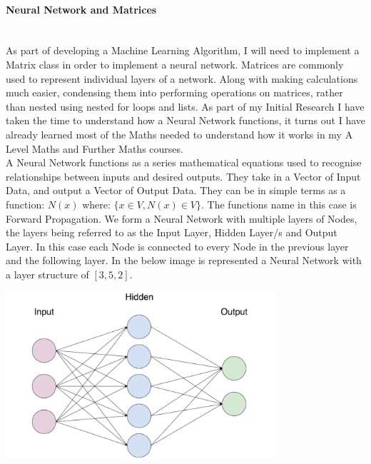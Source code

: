 \begin{flushleft}
                    \paragraph{Neural Network and Matrices} \mbox{} \\
                        As part of developing a Machine Learning Algorithm, I will need to implement a Matrix class in order to
                        implement a neural network. Matrices are commonly used to represent individual layers of a network. Along
                        with making calculations much easier, condensing them into performing operations on matrices, rather than
                        nested using nested for loops and lists. As part of my Initial Research I have taken the time to understand
                        how a Neural Network functions, it turns out I have already learned most of the Maths needed to understand
                        how it works in my A Level Maths and Further Maths courses. \\
                        \vspace{0.2cm}
                        A Neural Network functions as a series mathematical equations used to recognise relationships between inputs
                        and desired outputs. They take in a Vector of Input Data, and output a Vector of Output Data. They can be
                        in simple terms as a function: $N(x)$ where: $\{x \in V, N(x) \in V\}$. The functions name in this case is
                        Forward Propagation. 
                        \vspace{0.2cm}
                        We form a Neural Network with multiple layers of Nodes, the layers being referred to as the Input Layer, 
                        Hidden Layer/s and Output Layer. In this case each Node is connected to every Node in the previous layer and
                        the following layer. In the below image is represented a Neural Network with a layer structure of $[3, 5, 2]$.

                        \vspace{0.1cm}
                        \centerline{\includegraphics[width=10cm]{Images/InitialResearch/NeuralNetworkExample.png}}


\end{flushleft}
